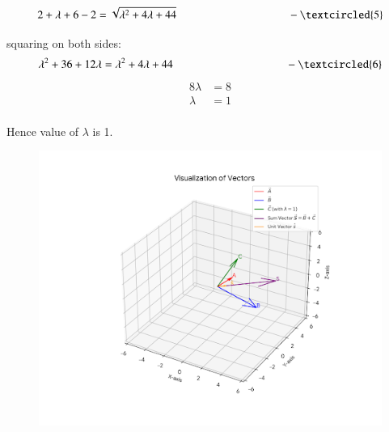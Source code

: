 \documentclass[journal]{IEEEtran}
\begin{document}
\[2 + \lambda + 6 - 2 = \sqrt{\lambda^2 + 4\lambda + 44} \qquad \qquad   \qquad \qquad \qquad -\textcircled{5}\]

squaring on both sides:
\[\lambda^2 + 36 + 12\lambda = \lambda^2 + 4\lambda + 44  \qquad  \qquad \qquad \qquad \qquad -\textcircled{6}\] 
\[\begin{aligned}8\lambda &= 8 \\\lambda &= 1\end{aligned}\]\\
Hence value of $\lambda$ is 1.


\begin{figure}[H]
    \centering
    \includegraphics[width=0.8\linewidth]{figs/graph-1.png}
    \caption{}
    \label{fig:placeholder}
\end{figure}
\end{document}
